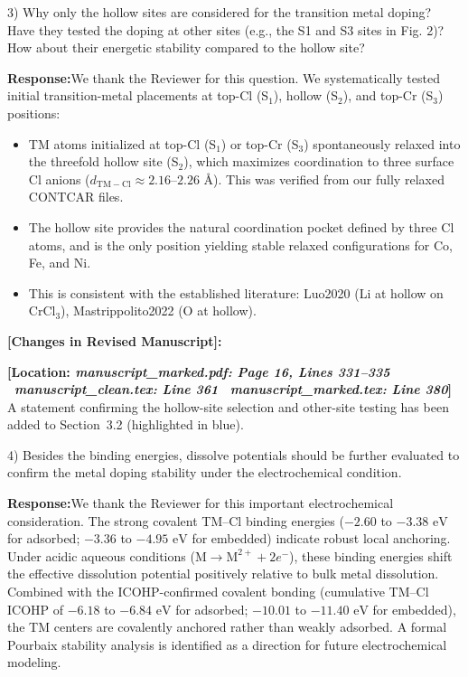 \documentclass[11pt, sans, a4paper]{moderncv}
\newcommand{\response}{\vspace{0.4em}\noindent\textbf{\color{actionblue}Response:}\hspace{0.5em}}
\newcommand{\manuscriptchange}[1]{\vspace{0.4em}\noindent\textbf{\color{acsblue}[Changes in Revised Manuscript]:}\par\nopagebreak\vspace{0.15em}#1\vspace{0.4em}}
\begin{document}
\vspace{0.8em}

\begin{reviewercomment}
3) Why only the hollow sites are considered for the transition metal doping? Have they tested the doping at other sites (e.g., the S1 and S3 sites in Fig. 2)? How about their energetic stability compared to the hollow site?
\end{reviewercomment}

\response We thank the Reviewer for this question. We systematically tested initial transition-metal placements at top-Cl (S$_1$), hollow (S$_2$), and top-Cr (S$_3$) positions:
\begin{itemize}[leftmargin=1.5em, itemsep=0.2em]
\item TM atoms initialized at top-Cl (S$_1$) or top-Cr (S$_3$) spontaneously relaxed into the threefold hollow site (S$_2$), which maximizes coordination to three surface Cl anions ($d_{\mathrm{TM-Cl}} \approx 2.16\text{--}2.26\text{ \AA}$). This was verified from our fully relaxed CONTCAR files.
\item The hollow site provides the natural coordination pocket defined by three Cl atoms, and is the only position yielding stable relaxed configurations for Co, Fe, and Ni.
\item This is consistent with the established literature: Luo2020 (Li at hollow on CrCl$_3$), Mastrippolito2022 (O at hollow).
\end{itemize}

\manuscriptchange{\textbf{[Location: \textit{manuscript\_marked.pdf: Page 16, Lines 331--335} \textbar\ \textit{manuscript\_clean.tex: Line 361} \textbar\ \textit{manuscript\_marked.tex: Line 380}]}\\ A statement confirming the hollow-site selection and other-site testing has been added to Section~3.2 (highlighted in blue).}

\vspace{0.8em}

\begin{reviewercomment}
4) Besides the binding energies, dissolve potentials should be further evaluated to confirm the metal doping stability under the electrochemical condition.
\end{reviewercomment}

\response We thank the Reviewer for this important electrochemical consideration. The strong covalent TM--Cl binding energies ($-2.60$ to $-3.38\text{ eV}$ for adsorbed; $-3.36$ to $-4.95\text{ eV}$ for embedded) indicate robust local anchoring. Under acidic aqueous conditions ($\text{M} \rightarrow \text{M}^{2+} + 2e^-$), these binding energies shift the effective dissolution potential positively relative to bulk metal dissolution. Combined with the ICOHP-confirmed covalent bonding (cumulative TM--Cl ICOHP of $-6.18$ to $-6.84\text{ eV}$ for adsorbed; $-10.01$ to $-11.40\text{ eV}$ for embedded), the TM centers are covalently anchored rather than weakly adsorbed. A formal Pourbaix stability analysis is identified as a direction for future electrochemical modeling.
\end{document}
